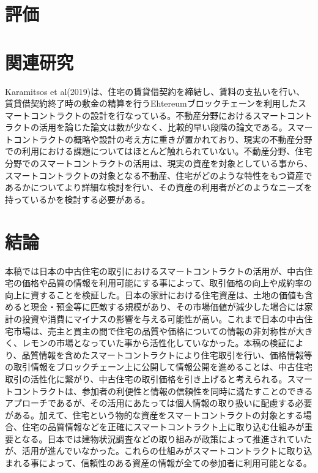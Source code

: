 \documentclass[a4paper,fontsize=11pt,report,notitlepage,line_length=38zw,number_of_lines=40,dvipdfmx]{jlreq}
\begin{document}
\chapter{評価}


\chapter{関連研究}
Karamitsos et al(2019)\cite{karamitsos2019}は、住宅の賃貸借契約を締結し、賃料の支払いを行い、賃貸借契約終了時の敷金の精算を行うEhtereumブロックチェーンを利用したスマートコントラクトの設計を行なっている。不動産分野におけるスマートコントラクトの活用を論じた論文は数が少なく、比較的早い段階の論文である。スマートコントラクトの概略や設計の考え方に重きが置かれており、現実の不動産分野での利用における課題についてはほとんど触れられていない。不動産分野、住宅分野でのスマートコントラクトの活用は、現実の資産を対象としている事から、スマートコントラクトの対象となる不動産、住宅がどのような特性をもつ資産であるかについてより詳細な検討を行い、その資産の利用者がどのようなニーズを持っているかを検討する必要がある。

\chapter{結論}
本稿では日本の中古住宅の取引におけるスマートコントラクトの活用が、中古住宅の価格や品質の情報を利用可能にする事によって、取引価格の向上や成約率の向上に資することを検証した。日本の家計における住宅資産は、土地の価値も含めると現金・預金等に匹敵する規模があり、その市場価値が減少した場合には家計の投資や消費にマイナスの影響を与える可能性が高い。これまで日本の中古住宅市場は、売主と買主の間で住宅の品質や価格についての情報の非対称性が大きく、レモンの市場となっていた事から活性化していなかった。本稿の検証により、品質情報を含めたスマートコントラクトにより住宅取引を行い、価格情報等の取引情報をブロックチェーン上に公開して情報公開を進めることは、中古住宅取引の活性化に繋がり、中古住宅の取引価格を引き上げると考えられる。スマートコントラクトは、参加者の利便性と情報の信頼性を同時に満たすことのできるアプローチであるが、その活用にあたっては個人情報の取り扱いに配慮する必要がある。加えて、住宅という物的な資産をスマートコントラクトの対象とする場合、住宅の品質情報などを正確にスマートコントラクト上に取り込む仕組みが重要となる。日本では建物状況調査などの取り組みが政策によって推進されていたが、活用が進んでいなかった。これらの仕組みがスマートコントラクトに取り込まれる事によって、信頼性のある資産の情報が全ての参加者に利用可能となる。
\end{document}
